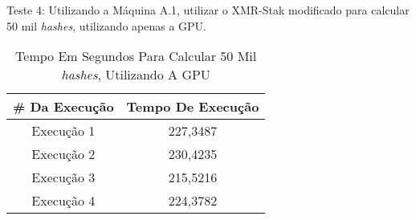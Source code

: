 Teste 4: Utilizando a Máquina A.1, utilizar o XMR-Stak modificado para calcular 50 mil \textit{hashes}, utilizando apenas a \acrshort{GPU}.

\begin {table}[H]
\begin{center}
	\begin{tabular}{ |c|c| } 
		\hline
		\#  Da Execução & Tempo De Execução \\ 
		\hline
		Execução 1 & 227,3487 \\ 
		\hline
		Execução 2 & 230,4235 \\ 
		\hline
		Execução 3 & 215,5216 \\ 
		\hline
		Execução 4 & 224,3782 \\ 
		\hline
	\end{tabular}
	\caption {Tempo Em Segundos Para Calcular 50 Mil \textit{hashes}, Utilizando A \acrshort{GPU}} \label{TabelaTempoXMR-Stak-GPU} 
\end{center}
\end {table}

